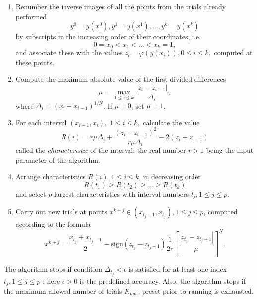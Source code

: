 \documentclass{svproc}
\begin{document}
\begin{enumerate}
	\item 
	Renumber the inverse images of all the points from the trials already performed  
\begin{equation}\label{y_i}
y^0=y(x^0), y^1=y(x^1),...,y^k=y(x^k)
\end{equation}
by subscripts in the increasing order of their coordinates, i.e.
\begin{equation}\label{x_i}
0=x_0<x_1<\dots <x_k=1,
\end{equation}
and associate these with the values $z_i=\varphi(y(x_i)), 0\leq i \leq k,$  computed at these points.
\item
Compute the maximum absolute value of the first divided differences
\begin{equation}\label{mu}
\mu = \max_{1 \leq i \leq k}\frac{\left|z_i-z_{i-1}\right|}{\Delta_i},
\end{equation}
where $\Delta_i=\left(x_i-x_{i-1}\right)^{1/N}$. If $\mu = 0$, set $\mu = 1$.
\item
For each interval $(x_{i-1}, x_i), \; 1\leq i \leq k,$  calculate the value
\begin{equation}\label{R}
R(i)=r\mu\Delta_i+\frac{(z_i-z_{i-1})^2}{r\mu\Delta_i}-2(z_i+z_{i-1})
\end{equation}
called the \textit{characteristic} of the interval; the real number $r>1$ being the input parameter of the algorithm.

\item 
Arrange characteristics  $R(i), 1 \leq i \leq k$, in decreasing order 
\begin{equation}\label{Rdec}
R(t_1)\geq R(t_2)\geq \dots \geq R(t_{k})
\end{equation}
and select $p$ largest characteristics with interval numbers $t_j, 1\leq j \leq p$.
\item
Carry out new trials at points $x^{k+j}\in(x_{t_j-1},x_{t_j}), 1\leq j\leq p$, computed according to the formula
\[
x^{k+j} = \frac{x_{t_j}+x_{t_j-1}}{2} - \mathrm{sign}(z_{t_j}-z_{t_j-1})\frac{1}{2r}\left[\frac{\left|z_{t_j}-z_{t_j-1}\right|}{\mu}\right]^N.
\]

\end{enumerate}

The algorithm stops if condition $\Delta_{t_j}<\epsilon$ is satisfied for at least one index $t_j, 1 \leq j \leq p$ ; here $\epsilon>0$ is the predefined accuracy. Also, the algorithm stops if the maximum allowed number of trials $K_{max}$ preset prior to running is exhausted.
\end{document}
